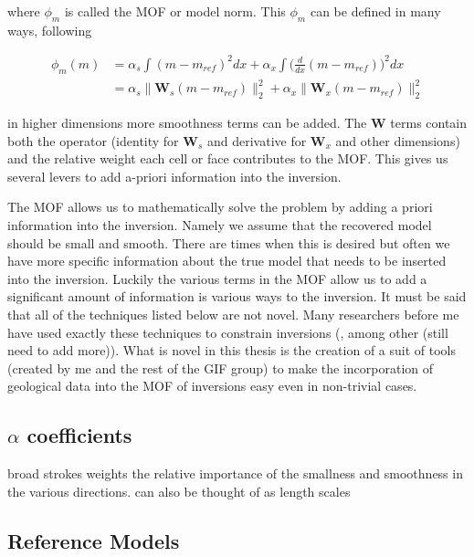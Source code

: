 where $\phi_m$ is called the \ac{MOF} or model norm. This $\phi_m$ can be defined in many ways, following  \cite{oldenburg2005inversion}

\begin{align}
\phi_m(m) &= \alpha_s\int(m-m_{ref})^2dx+\alpha_x\int\bigg(\frac{d}{dx}(m-m_{ref})\bigg)^2dx\\
&=\alpha_s\|\textbf{W}_s(m-m_{ref})\|^2_2+\alpha_x\|\textbf{W}_x(m-m_{ref})\|^2_2
\end{align}
\label{eq:MOF}

in higher dimensions more smoothness terms can be added. The $\textbf{W}$ terms contain both the operator (identity for $\textbf{W}_s$ and derivative for $\textbf{W}_x$ and other dimensions) and the relative weight each cell or face contributes to the \ac{MOF}. This gives us several levers to add a-priori information into the inversion.

The \ac{MOF} allows us to mathematically solve the problem by adding a priori information into the inversion. Namely we assume that the recovered model should be small and smooth. There are times when this is desired but often we have more specific information about the true model that needs to be inserted into the inversion. Luckily the various terms in the \ac{MOF} allow us to add a significant amount of information is various ways to the inversion.
	It must be said that all of the techniques listed below are not novel. Many researchers before me have used exactly these techniques to constrain inversions (\cite{williams2008geologicall},\cite{Lelievre2009Integrating} among other (still need to add more)). What is novel in this thesis is the creation of a suit of tools (created by me and the rest of the GIF group) to make the incorporation of geological data into the \ac{MOF} of inversions easy even in non-trivial cases.

\subsection{$\alpha$ coefficients}
\label{sec:alpha coefficients}

broad strokes weights the relative importance of the smallness and smoothness in the various directions. can also be thought of as length scales

\subsection{Reference Models}
\label{sec:Reference Models}

